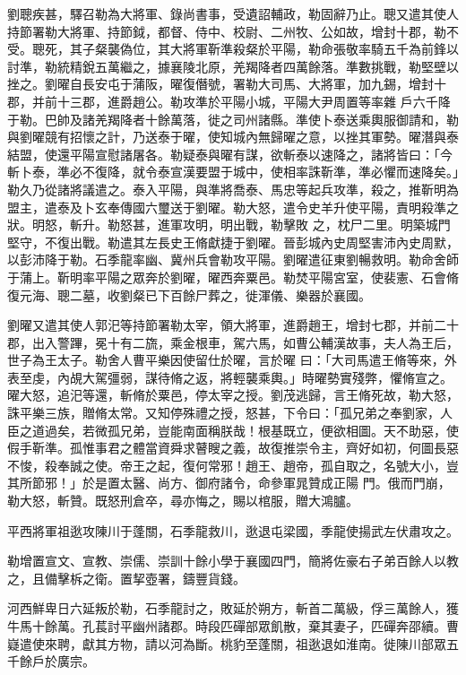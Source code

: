 \begin{pinyinscope}
 劉聰疾甚，驛召勒為大將軍、錄尚書事，受遺詔輔政，勒固辭乃止。聰又遣其使人持節署勒大將軍、持節鉞，都督、侍中、校尉、二州牧、公如故，增封十郡，勒不受。聰死，其子粲襲偽位，其大將軍靳準殺粲於平陽，勒命張敬率騎五千為前鋒以討準，勒統精銳五萬繼之，據襄陵北原，羌羯降者四萬餘落。準數挑戰，勒堅壁以挫之。劉曜自長安屯于蒲阪，曜復僭號，署勒大司馬、大將軍，加九錫，增封十郡，并前十三郡，進爵趙公。勒攻準於平陽小城，平陽大尹周置等率雜
 戶六千降于勒。巴帥及諸羌羯降者十餘萬落，徙之司州諸縣。準使卜泰送乘輿服御請和，勒與劉曜競有招懷之計，乃送泰于曜，使知城內無歸曜之意，以挫其軍勢。曜潛與泰結盟，使還平陽宣慰諸屠各。勒疑泰與曜有謀，欲斬泰以速降之，諸將皆曰：「今斬卜泰，準必不復降，就令泰宣漢要盟于城中，使相率誅靳準，準必懼而速降矣。」勒久乃從諸將議遣之。泰入平陽，與準將喬泰、馬忠等起兵攻準，殺之，推靳明為盟主，遣泰及卜玄奉傳國六璽送于劉曜。勒大怒，遣令史羊升使平陽，責明殺準之狀。明怒，斬升。勒怒甚，進軍攻明，明出戰，勒擊敗
 之，枕尸二里。明築城門堅守，不復出戰。勒遣其左長史王脩獻捷于劉曜。晉彭城內史周堅害沛內史周默，以彭沛降于勒。石季龍率幽、冀州兵會勒攻平陽。劉曜遣征東劉暢救明。勒命舍師于蒲上。靳明率平陽之眾奔於劉曜，曜西奔粟邑。勒焚平陽宮室，使裴憲、石會脩復元海、聰二墓，收劉粲已下百餘尸葬之，徙渾儀、樂器於襄國。



 劉曜又遣其使人郭汜等持節署勒太宰，領大將軍，進爵趙王，增封七郡，并前二十郡，出入警蹕，冕十有二旒，乘金根車，駕六馬，如曹公輔漢故事，夫人為王后，世子為王太子。勒舍人曹平樂因使留仕於曜，言於曜
 曰：「大司馬遣王脩等來，外表至虔，內覘大駕彊弱，謀待脩之返，將輕襲乘輿。」時曜勢實殘弊，懼脩宣之。曜大怒，追汜等還，斬脩於粟邑，停太宰之授。劉茂逃歸，言王脩死故，勒大怒，誅平樂三族，贈脩太常。又知停殊禮之授，怒甚，下令曰：「孤兄弟之奉劉家，人臣之道過矣，若微孤兄弟，豈能南面稱朕哉！根基既立，便欲相圖。天不助惡，使假手靳準。孤惟事君之體當資舜求瞽瞍之義，故復推崇令主，齊好如初，何圖長惡不悛，殺奉誠之使。帝王之起，復何常邪！趙王、趙帝，孤自取之，名號大小，豈其所節邪！」於是置太醫、尚方、御府諸令，命參軍晁贊成正陽
 門。俄而門崩，勒大怒，斬贊。既怒刑倉卒，尋亦悔之，賜以棺服，贈大鴻臚。



 平西將軍祖逖攻陳川于蓬關，石季龍救川，逖退屯梁國，季龍使揚武左伏肅攻之。



 勒增置宣文、宣教、崇儒、崇訓十餘小學于襄國四門，簡將佐豪右子弟百餘人以教之，且備擊柝之衛。置挈壺署，鑄豐貨錢。



 河西鮮卑日六延叛於勒，石季龍討之，敗延於朔方，斬首二萬級，俘三萬餘人，獲牛馬十餘萬。孔萇討平幽州諸郡。時段匹磾部眾飢散，棄其妻子，匹磾奔邵續。曹嶷遣使來聘，獻其方物，請以河為斷。桃豹至蓬關，祖逖退如淮南。徙陳川部眾五千餘戶於廣宗。




\end{pinyinscope}
